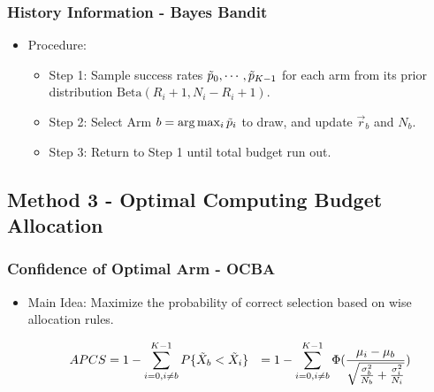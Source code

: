 \documentclass[compress]{beamer}
\begin{document}
\begin{frame}
\frametitle{History Information - Bayes Bandit}
\begin{itemize}
  \item Procedure:
    \begin{itemize}
      \item Step 1: Sample success rates $\Tilde p_{0}, \cdots, \Tilde p_{K-1}$ for each arm from its prior distribution $\mbox{Beta}(R_{i} + 1, N_{i} - R_{i} + 1)$.
      \item Step 2: Select Arm $b = \arg \max_{i} \Tilde p_{i}$ to draw, and update $\vec r_{b}$ and $N_{b}$.
      \item Step 3: Return to Step 1 until total budget run out.
    \end{itemize}
\end{itemize}
\end{frame}

\subsection{Method 3 - Optimal Computing Budget Allocation}

\begin{frame}
\frametitle{Confidence of Optimal Arm - OCBA}
\begin{itemize}
  \item Main Idea: Maximize the probability of correct selection based on wise allocation rules.
                  \begin{scriptsize}
                  \begin{align}
                    APCS & = 1 - \sum_{i=0, i \neq b}^{K-1} P \{\Tilde X_{b} < \Tilde X_{i} \} & = 1 - \sum_{i=0, i \neq b}^{K-1} \Phi(\frac{\mu_{i} - \mu_{b}}{\sqrt{\frac{\sigma_{b}^{2}}{N_{b}} + \frac{\sigma_{i}^{2}}{N_{i}}}})
                  \end{align}
                  \end{scriptsize}
\end{itemize}
\end{frame}
\end{document}
